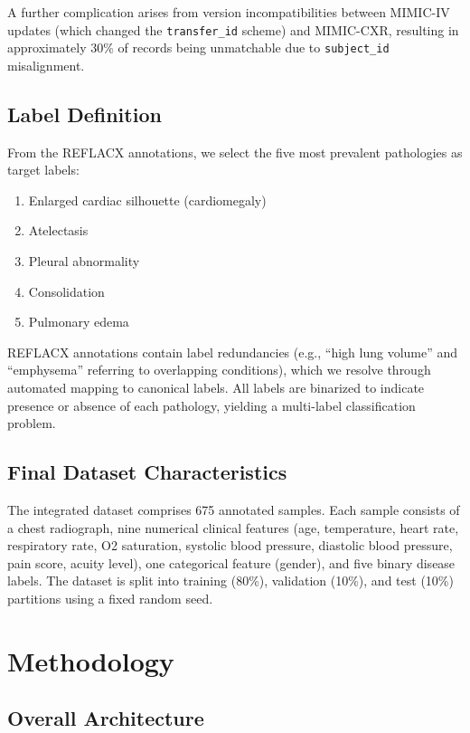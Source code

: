 \documentclass[conference]{IEEEtran}
\begin{document}
A further complication arises from version incompatibilities between MIMIC-IV updates (which changed the \texttt{transfer\_id} scheme) and MIMIC-CXR, resulting in approximately 30\% of records being unmatchable due to \texttt{subject\_id} misalignment.

\subsection{Label Definition}

From the REFLACX annotations, we select the five most prevalent pathologies as target labels:
\begin{enumerate}
    \item Enlarged cardiac silhouette (cardiomegaly)
    \item Atelectasis
    \item Pleural abnormality
    \item Consolidation
    \item Pulmonary edema
\end{enumerate}
REFLACX annotations contain label redundancies (e.g., ``high lung volume'' and ``emphysema'' referring to overlapping conditions), which we resolve through automated mapping to canonical labels. All labels are binarized to indicate presence or absence of each pathology, yielding a multi-label classification problem.

\subsection{Final Dataset Characteristics}

The integrated dataset comprises 675 annotated samples. Each sample consists of a chest radiograph, nine numerical clinical features (age, temperature, heart rate, respiratory rate, O2 saturation, systolic blood pressure, diastolic blood pressure, pain score, acuity level), one categorical feature (gender), and five binary disease labels. The dataset is split into training (80\%), validation (10\%), and test (10\%) partitions using a fixed random seed.

\section{Methodology}\label{sec:method}

\subsection{Overall Architecture}
\end{document}
